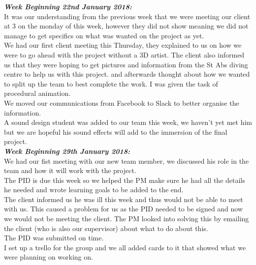 \documentclass[10pt, a4paper]{article}
\begin{document}
    \textbf{\textit{Week Beginning 22nd January 2018:}}\\
    It was our understanding from the previous week that we were meeting our client at 3 on the monday of this week, however they did not show meaning we did not manage to get specifics on what was wanted on the project as yet.\\
    
    We had our first client meeting this Thursday, they explained to us on how we were to go ahead with the project without a 3D artist. The client also informed us that they were hoping to get pictures and information from the St Abs diving centre to help us with this project. and afterwards thought about how we wanted to split up the team to best complete the work. I was given the task of procedural animation.\\
    
    We moved our communications from Facebook to Slack to better organise the information.\\
    
    A sound design student was added to our team this week, we haven't yet met him but we are hopeful his sound effects will add to the immersion of the final project.\\ 
    
    \textbf{\textit{Week Beginning 29th January 2018:}}\\
    
    We had our fist meeting with our new team member, we discussed his role in the team and how it will work with the project.\\
    
    The PID is due this week so we helped the PM make sure he had all the details he needed and wrote learning goals to be added to the end.\\
    
    The client informed us he was ill this week and thus would not be able to meet with us. This caused a problem for us as the PID needed to be signed and now we would not be meeting the client. The PM looked into solving this by emailing the client (who is also our supervisor) about what to do about this.\\
    
    The PID was submitted on time.\\
    
    I set up a trello for the group and we all added cards to it that showed what we were planning on working on.\\
    
\end{document}
